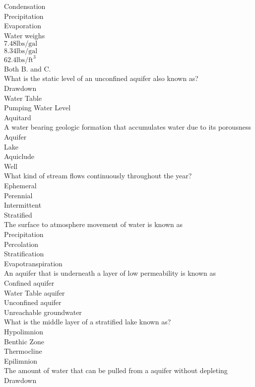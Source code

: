 Condensation\\
Precipitation\\
Evaporation\\
 Water weighs\\
$7.48 \mathrm{lbs} / \mathrm{gal}$\\
$8.34 \mathrm{lbs} / \mathrm{gal}$\\
$62.4 \mathrm{lbs} / \mathrm{ft}^{3}$\\
Both B. and C.\\
 What is the static level of an unconfined aquifer also known as?\\
Drawdown\\
Water Table\\
Pumping Water Level\\
Aquitard\\
A water bearing geologic formation that accumulates water due to its porousness\\
Aquifer\\
Lake\\
Aquiclude\\
Well\\
 What kind of stream flows continuously throughout the year?\\
Ephemeral\\
Perennial\\
Intermittent\\
Stratified\\
 The surface to atmosphere movement of water is known as\\
Precipitation\\
Percolation\\
Stratification\\
Evapotranspiration\\
 An aquifer that is underneath a layer of low permeability is known as\\
Confined aquifer\\
Water Table aquifer\\
Unconfined aquifer\\
Unreachable groundwater\\
 What is the middle layer of a stratified lake known as?\\
Hypolimnion\\
Benthic Zone\\
Thermocline\\
Epilimnion\\
 The amount of water that can be pulled from a aquifer without depleting\\
Drawdown\\
